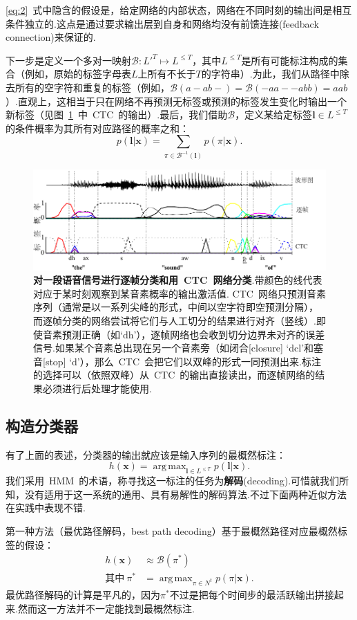 \documentclass{ctexart}
\DeclareMathOperator*{\argmax}{arg\,max}
\def\cB{\mathcal{B}}
\def\vl{\mathbf{l}}
\def\vx{\mathbf{x}}
\begin{document}
\eqref{eq:2}~式中隐含的假设是，给定网络的内部状态，网络在不同时刻的输出间是相互条件独立的.这点是通过要求输出层到自身和网络均没有前馈连接(feedback connection)来保证的.

下一步是定义一个多对一映射$\cB: L'^T\mapsto L^{\le T}$，其中$L^{\le T}$是所有可能标注构成的集合（例如，原始的标签字母表$L$上所有不长于$T$的字符串）.为此，我们从路径中除去所有的空字符和重复的标签（例如，$\cB(a-ab-)=\cB(-aa--abb)=aab$）.直观上，这相当于只在网络不再预测无标签或预测的标签发生变化时输出一个新标签（见图~\ref{fig:1}~中~CTC~的输出）.最后，我们借助$\cB$，定义某给定标签$\vl\in L^{\le T}$的条件概率为其所有对应路径的概率之和：
\begin{equation}
	\label{eq:3}
	p(\vl|\vx) = \sum_{\pi\in\cB^{-1}(\vl)}p(\pi|\vx).
\end{equation}
\begin{figure}
	\label{fig:1}
	\centering
	\includegraphics[width=\textwidth]{fig/1}
	\caption{\textbf{对一段语音信号进行逐帧分类和用~CTC~网络分类}.带颜色的线代表对应于某时刻观察到某音素概率的输出激活值. CTC~网络只预测音素序列（通常是以一系列尖峰的形式，中间以空字符即空预测分隔），而逐帧分类的网络尝试将它们与人工切分的结果进行对齐（竖线）.即使音素预测正确（如`dh'），逐帧网络也会收到切分边界未对齐的误差信号.如果某个音素总出现在另一个音素旁（如闭合[closure] `dcl'和塞音[stop] `d'），那么~CTC~会把它们以双峰的形式一同预测出来.标注的选择可以（依照双峰）从~CTC~的输出直接读出，而逐帧网络的结果必须进行后处理才能使用.}
\end{figure}
\subsection{构造分类器}
\label{sec:classifier}
有了上面的表述，分类器的输出就应该是输入序列的最概然标注：
\[h(\vx) = \argmax_{\vl\in L^{\le T}} p(\vl|\vx).\]
我们采用~HMM~的术语，称寻找这一标注的任务为\textbf{解码}(decoding).可惜就我们所知，没有适用于这一系统的通用、具有易解性的解码算法.不过下面两种近似方法在实践中表现不错.

第一种方法（最优路径解码，best path decoding）基于最概然路径对应最概然标签的假设：
\begin{equation}
	\begin{split}
		h(\vx) & \approx \cB(\pi^*)\\
		\text{其中}~\pi^* & = \argmax_{\pi\in N^t}p(\pi|\vx).
	\end{split}
\end{equation}
最优路径解码的计算是平凡的，因为$\pi^*$不过是把每个时间步的最活跃输出拼接起来.然而这一方法并不一定能找到最概然标注.
\end{document}
